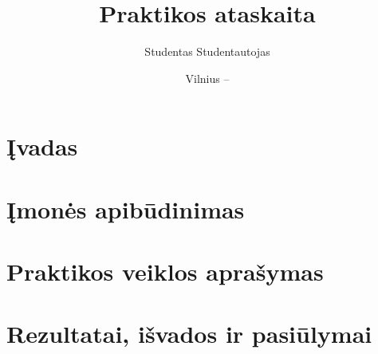 \documentclass{VUMIFPSkursinis}
\title{Praktikos ataskaita}
\author{Studentas Studentautojas}
\date{Vilnius – \the\year}
\begin{document}
\maketitle
\addtocounter{page}{1}
\tableofcontents

\section{Įvadas}

\section{Įmonės apibūdinimas}

\section{Praktikos veiklos aprašymas}

\section{Rezultatai, išvados ir pasiūlymai}
		
\printbibliography[heading=bibintoc]
\end{document}
